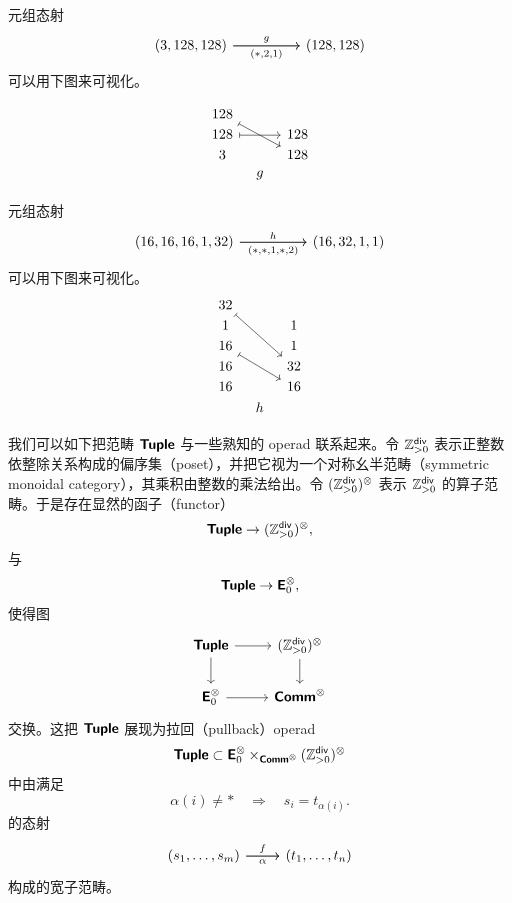 \begin{example}
\label{morphismginC}
元组态射
\[\begin{tikzcd}
(3,128,128) \ar[rr,"g"] \ar[rr,swap,"(*{,}2{,}1)"] & &  (128,128)
\end{tikzcd} \]
可以用下图来可视化。

\[
    \begin{tikzcd}[row sep = 1, column sep = 8]
     128 \ar[rrdd, mapsto] & &  \\
     128 \ar[rr,mapsto] & & 128 \\
     3 & & 128 \\
     & g & \\
    \end{tikzcd}
    \]
\end{example}
\begin{example}\label{morphismhinC}
    元组态射
    \[ \begin{tikzcd}
    (16,16,16,1,32) \ar[rr,"h"] \ar[rr,swap,"(*{,}*{,}1{,}*{,}2)"] & &  (16,32,1,1)
    \end{tikzcd} \]
    可以用下图来可视化。
    \[
    \begin{tikzcd} [row sep = 1, column sep = 8]
    32 \ar[dddrr,mapsto] & & \\
    1 & & 1 \\
    16 \ar[ddrr,mapsto] & & 1 \\
    16 & & 32 \\
    16 & & 16 \\
    & h & \\
    \end{tikzcd}
    \]
\end{example}

\begin{observation}
    我们可以如下把范畴 ${\boldsymbol{\mathsf{Tuple}}}$ 与一些熟知的 operad 联系起来。令 $\mathbb{Z}_{>0}^{\mathsf{div}}$ 表示正整数依整除关系构成的偏序集（poset），并把它视为一个对称幺半范畴（symmetric monoidal category），其乘积由整数的乘法给出。令 $(\mathbb{Z}_{>0}^{\mathsf{div}})^\otimes$ 表示 $\mathbb{Z}_{>0}^{\mathsf{div}}$ 的算子范畴。于是存在显然的函子（functor）\[{\boldsymbol{\mathsf{Tuple}}} \to (\mathbb{Z}_{>0}^{\mathsf{div}})^\otimes,\]与\[{\boldsymbol{\mathsf{Tuple}}} \to {\boldsymbol{\mathsf{E}}}_0^\otimes,\]使得图
    \[ \begin{tikzcd}
    \catstyle{Tuple} \ar[r] \ar[d] & (\mathbb{Z}_{>0}^{\mathterm{div}})^\otimes \ar[d] \\
    \catstyle{E}_0^\otimes \ar[r] & \catstyle{Comm}^\otimes
    \end{tikzcd} \]
    交换。这把 ${\boldsymbol{\mathsf{Tuple}}}$ 展现为拉回（pullback）operad
    \[
    {\boldsymbol{\mathsf{Tuple}}} \subset {\boldsymbol{\mathsf{E}}}_0^\otimes \times_{{\boldsymbol{\mathsf{Comm}}}^\otimes}(\mathbb{Z}_{>0}^{\mathsf{div}})^\otimes\]
    中由满足
    \[
    \alpha(i) \neq * \quad \Rightarrow \quad  s_i = t_{\alpha(i)}.
    \]
    的态射
    \[\begin{tikzcd} (s_1,\dots,s_m) \ar[r,"f"] \ar[r,swap,"\alpha"] & (t_1,\dots,t_n)
    \end{tikzcd}\]
    构成的宽子范畴。
\end{observation}

